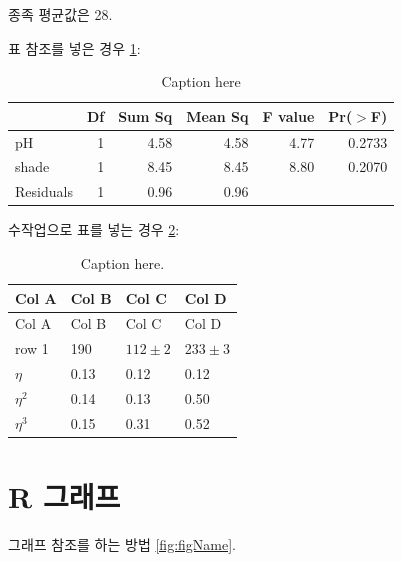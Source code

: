 \documentclass[12pt,]{article}
\begin{document}
종족 평균값은 28.

표 참조를 넣은 경우 \ref{t:anova}:

\begin{table}[ht]
\centering
\caption{Caption here} 
\label{t:anova}
\begin{tabular}{lrrrrr}
  \toprule
 & Df & Sum Sq & Mean Sq & F value & Pr($>$F) \\ 
  \midrule
pH          & 1 & 4.58 & 4.58 & 4.77 & 0.2733 \\ 
  shade       & 1 & 8.45 & 8.45 & 8.80 & 0.2070 \\ 
  Residuals   & 1 & 0.96 & 0.96 &  &  \\ 
   \bottomrule
\end{tabular}
\end{table}

수작업으로 표를 넣는 경우 \ref{tab:byhand}:

\begin{longtable}[]{@{}llll@{}}
\caption{\label{tab:byhand} Caption here.}\tabularnewline
\toprule
Col A & Col B & Col C & Col D\tabularnewline
\midrule
\endfirsthead
\toprule
Col A & Col B & Col C & Col D\tabularnewline
\midrule
\endhead
row 1 & 190 & \(112 \pm 2\) & \(233 \pm 3\)\tabularnewline
\(\eta\) & 0.13 & 0.12 & 0.12\tabularnewline
\(\eta^2\) & 0.14 & 0.13 & 0.50\tabularnewline
\(\eta^3\) & 0.15 & 0.31 & 0.52\tabularnewline
\bottomrule
\end{longtable}

\section{R 그래프}\label{r-}

그래프 참조를 하는 방법 \ref{fig:figName}.
\end{document}
